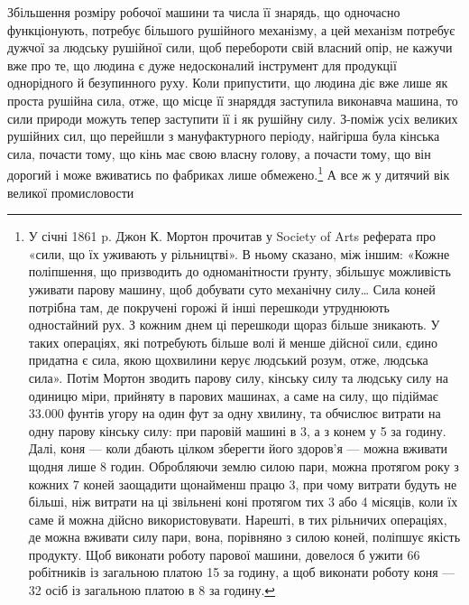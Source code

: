Збільшення розміру робочої машини та числа її знарядь,
що одночасно функціонують, потребує більшого рушійного механізму,
а цей механізм потребує дужчої за людську рушійної сили,
щоб перебороти свій власний опір, не кажучи вже про те, що
людина є дуже недосконалий інструмент для продукції однорідного
й безупинного руху. Коли припустити, що людина діє
вже лише як проста рушійна сила, отже, що місце її знаряддя
заступила виконавча машина, то сили природи можуть тепер
заступити її і як рушійну силу. З-поміж усіх великих рушійних
сил, що перейшли з мануфактурного періоду, найгірша була
кінська сила, почасти тому, що кінь має свою власну голову,
а почасти тому, що він дорогий і може вживатись по фабриках
лише обмежено.\footnote{
У січні 1861 p. Джон К. Мортон прочитав у Society of Arts реферата
про «сили, що їх уживають у рільництві». В ньому сказано, між
іншим: «Кожне поліпшення, що призводить до одноманітности ґрунту,
збільшує можливість уживати парову машину, щоб добувати суто механічну
силу\dots{} Сила коней потрібна там, де покручені горожі й інші перешкоди
утруднюють одностайний рух. З кожним днем ці перешкоди щораз
більше зникають. У таких операціях, які потребують більше волі й менше
дійсної сили, єдино придатна є сила, якою щохвилини керує людський
розум, отже, людська сила». Потім Мортон зводить парову силу, кінську
силу та людську силу на одиницю міри, прийняту в парових машинах,
а саме на силу, що підіймає \num{33.000} фунтів угору на один фут за одну хвилину,
та обчислює витрати на одну парову кінську силу: при паровій
машині в 3, а з конем у 5 за годину. Далі, коня — коли
дбають цілком зберегти його здоров’я — можна вживати щодня лише
8 годин. Обробляючи землю силою пари, можна протягом року з кожних
7 коней заощадити щонайменш працю 3, при чому витрати будуть не
більші, ніж витрати на ці звільнені коні протягом тих 3 або 4 місяців,
коли їх саме й можна дійсно використовувати. Нарешті, в тих рільничих
операціях, де можна вживати силу пари, вона, порівняно з силою коней,
поліпшує якість продукту. Щоб виконати роботу парової машини, довелося
б ужити 66 робітників із загальною платою 15 за годину,
а щоб виконати роботу коня — 32 осіб із загальною платою в 8
за годину.
} А все ж у дитячий вік великої промисловости
\parbreak{}  %
